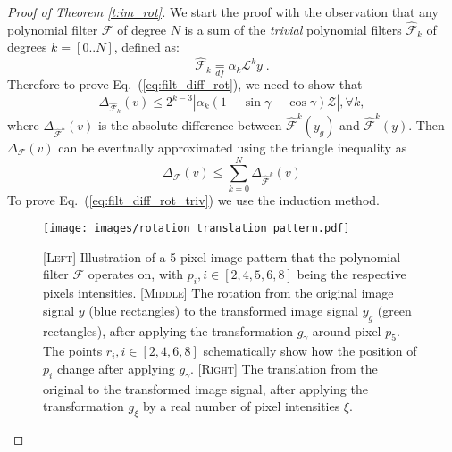 \documentclass[10pt,journal,compsoc]{IEEEtran}
\newcommand{\df}{\mathop{=}\limits_{df}}
\newcommand{\mF}{\mathcal{F}}
\newcommand{\hmF}{\hat{\mathcal{F}}}
\newcommand{\norm}[1]{\left|#1\right|}
\begin{document}
	\begin{proof}[Proof of Theorem \ref{t:im_rot}]



		We start the proof with the observation that any polynomial filter $\mathcal{F}$ of degree $N$ is a sum of the \emph{trivial} polynomial filters $\hmF_k$ of degrees $k = [0..N]$, defined as:
			\begin{equation}
			\hmF_k \df \alpha_k \mathcal{L}^k y \;.
			\end{equation}
			\noindent
			Therefore to prove Eq.~(\ref{eq:filt_diff_rot}), we need to show that
		\begin{equation}
		\Delta_{\hmF_k} (v) \leq 2^{k-3} \norm{\alpha_k(1 - \sin\gamma - \cos\gamma) \bar{\mathcal{Z}}}, \forall k,
		\label{eq:filt_diff_rot_triv}
		\end{equation}
		\noindent
		where $\Delta_{\hmF^k} (v)$ is the absolute difference between $\hmF^k(y_g)$ and $\hmF^k(y)$. Then $\Delta_{\mF} (v)$ can be eventually approximated using the triangle inequality as
		\begin{equation}
		\Delta_\mF (v) \leq \sum_{k=0}^{N} \Delta_{\hmF^k} (v)
		\label{eq:filt_diff_rot_sum}
		\end{equation}
		To prove Eq.~(\ref{eq:filt_diff_rot_triv}) we use the induction method.
		\begin{figure}
			\centering
			\texttt{[image: images/rotation\_translation\_pattern.pdf]}
			\caption{[\textsc{Left}] Illustration of a 5-pixel image pattern that the polynomial filter $\mathcal{F}$ operates on, with $p_i, i \in [2,4,5,6,8]$ being the respective pixels intensities. [\textsc{Middle}] The rotation from the original image signal $y$ (blue rectangles) to the transformed image signal $y_g$ (green rectangles), after applying the transformation $g_\gamma$ around pixel $p_5$. The points $r_i, i \in [2,4,6,8]$ schematically show how the position of $p_i$ change after applying $g_\gamma$. [\textsc{Right}] The translation from the original to the transformed image signal, after applying the transformation $g_\xi$ by a real number of pixel intensities $\xi$.}
			\label{fig:pattern}
		\end{figure}


\end{proof}
\end{document}
